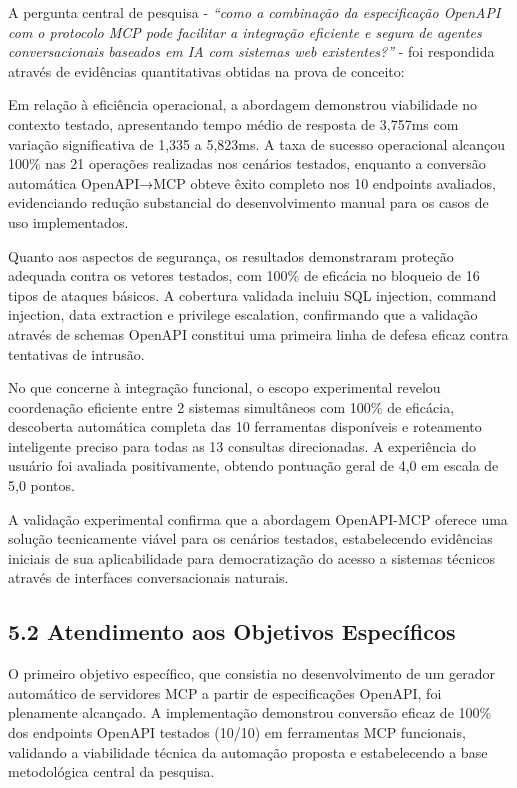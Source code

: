 \documentclass[
]{article}
\begin{document}
A pergunta central de pesquisa - \emph{``como a combinação da
especificação OpenAPI com o protocolo MCP pode facilitar a integração
eficiente e segura de agentes conversacionais baseados em IA com
sistemas web existentes?''} - foi respondida através de evidências
quantitativas obtidas na prova de conceito:

Em relação à eficiência operacional, a abordagem demonstrou viabilidade
no contexto testado, apresentando tempo médio de resposta de 3,757ms com
variação significativa de 1,335 a 5,823ms. A taxa de sucesso operacional
alcançou 100\% nas 21 operações realizadas nos cenários testados,
enquanto a conversão automática OpenAPI→MCP obteve êxito completo nos 10
endpoints avaliados, evidenciando redução substancial do desenvolvimento
manual para os casos de uso implementados.

Quanto aos aspectos de segurança, os resultados demonstraram proteção
adequada contra os vetores testados, com 100\% de eficácia no bloqueio
de 16 tipos de ataques básicos. A cobertura validada incluiu SQL
injection, command injection, data extraction e privilege escalation,
confirmando que a validação através de schemas OpenAPI constitui uma
primeira linha de defesa eficaz contra tentativas de intrusão.

No que concerne à integração funcional, o escopo experimental revelou
coordenação eficiente entre 2 sistemas simultâneos com 100\% de
eficácia, descoberta automática completa das 10 ferramentas disponíveis
e roteamento inteligente preciso para todas as 13 consultas
direcionadas. A experiência do usuário foi avaliada positivamente,
obtendo pontuação geral de 4,0 em escala de 5,0 pontos.

A validação experimental confirma que a abordagem OpenAPI-MCP oferece
uma solução tecnicamente viável para os cenários testados, estabelecendo
evidências iniciais de sua aplicabilidade para democratização do acesso
a sistemas técnicos através de interfaces conversacionais naturais.

\subsection{5.2 Atendimento aos Objetivos
Específicos}\label{atendimento-aos-objetivos-especuxedficos}

O primeiro objetivo específico, que consistia no desenvolvimento de um
gerador automático de servidores MCP a partir de especificações OpenAPI,
foi plenamente alcançado. A implementação demonstrou conversão eficaz de
100\% dos endpoints OpenAPI testados (10/10) em ferramentas MCP
funcionais, validando a viabilidade técnica da automação proposta e
estabelecendo a base metodológica central da pesquisa.
\end{document}
